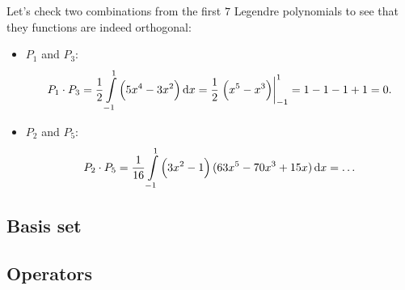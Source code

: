 	Let's check two combinations from the first $7$ Legendre polynomials to see that they functions are indeed orthogonal:
	\begin{itemize}
		\item $P_{1}$ and $P_{3}$:
			\[
				P_{1}\cdot P_{3} = \frac{1}{2}\int\limits_{-1}^{1}\left(5x^{4}-3x^{2}\right)\dif x = \frac{1}{2}\left.\left(x^{5}-x^{3}\right)\right|_{-1}^{1} = 1-1-1+1 = 0.
			\]
		\item $P_{2}$ and $P_{5}$:
			\[
				P_{2}\cdot P_{5} = \frac{1}{16}\int\limits_{-1}^{1}\left( 3x^{2}-1 \right)(63x^{5}-70x^{3}+15x)\dif x = \ldots
			\]
	\end{itemize}


\subsection{Basis set}

\subsection{Operators}
